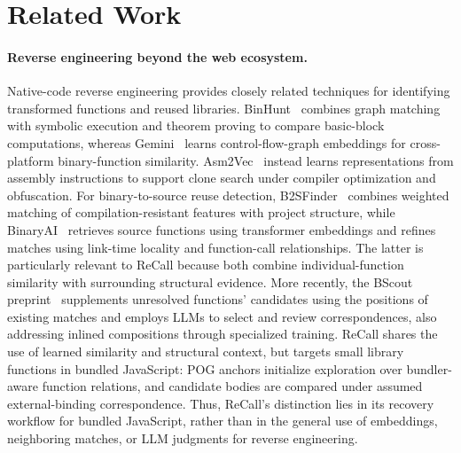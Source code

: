 \section{Related Work}
\label{sec:related-work}

\paragraph{Reverse engineering beyond the web ecosystem.}
Native-code reverse engineering provides closely related techniques for identifying transformed functions and reused libraries. BinHunt~\cite{gao2008binhunt} combines graph matching with symbolic execution and theorem proving to compare basic-block computations, whereas Gemini~\cite{xu2017gemini} learns control-flow-graph embeddings for cross-platform binary-function similarity. Asm2Vec~\cite{ding2019asm2vec} instead learns representations from assembly instructions to support clone search under compiler optimization and obfuscation. For binary-to-source reuse detection, B2SFinder~\cite{feng2019b2sfinder} combines weighted matching of compilation-resistant features with project structure, while BinaryAI~\cite{jiang2024binaryai} retrieves source functions using transformer embeddings and refines matches using link-time locality and function-call relationships. The latter is particularly relevant to ReCall because both combine individual-function similarity with surrounding structural evidence. More recently, the BScout preprint~\cite{li2026bscout} supplements unresolved functions' candidates using the positions of existing matches and employs LLMs to select and review correspondences, also addressing inlined compositions through specialized training. ReCall shares the use of learned similarity and structural context, but targets small library functions in bundled JavaScript: POG anchors initialize exploration over bundler-aware function relations, and candidate bodies are compared under assumed external-binding correspondence. Thus, ReCall's distinction lies in its recovery workflow for bundled JavaScript, rather than in the general use of embeddings, neighboring matches, or LLM judgments for reverse engineering.
